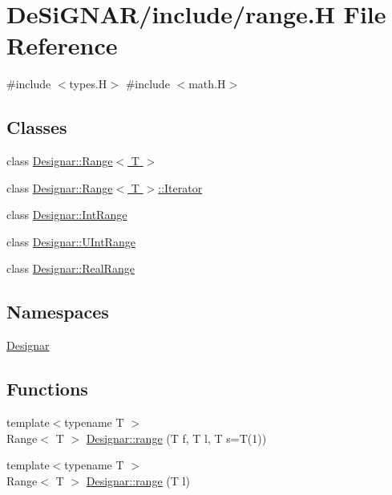 \hypertarget{range_8_h}{}\section{De\+Si\+G\+N\+A\+R/include/range.H File Reference}
\label{range_8_h}
{\ttfamily \#include $<$types.\+H$>$}\newline
{\ttfamily \#include $<$math.\+H$>$}\newline
\subsection*{Classes}
\begin{DoxyCompactItemize}
\item 
class \hyperlink{class_designar_1_1_range}{Designar\+::\+Range$<$ T $>$}
\item 
class \hyperlink{class_designar_1_1_range_1_1_iterator}{Designar\+::\+Range$<$ T $>$\+::\+Iterator}
\item 
class \hyperlink{class_designar_1_1_int_range}{Designar\+::\+Int\+Range}
\item 
class \hyperlink{class_designar_1_1_u_int_range}{Designar\+::\+U\+Int\+Range}
\item 
class \hyperlink{class_designar_1_1_real_range}{Designar\+::\+Real\+Range}
\end{DoxyCompactItemize}
\subsection*{Namespaces}
\begin{DoxyCompactItemize}
\item 
 \hyperlink{namespace_designar}{Designar}
\end{DoxyCompactItemize}
\subsection*{Functions}
\begin{DoxyCompactItemize}
\item 
{\footnotesize template$<$typename T $>$ }\\Range$<$ T $>$ \hyperlink{namespace_designar_aae435a76c71e126af37716ef5549d79d}{Designar\+::range} (T f, T l, T s=T(1))
\item 
{\footnotesize template$<$typename T $>$ }\\Range$<$ T $>$ \hyperlink{namespace_designar_a98dd2d05fccceaa32cdbf3f34c7dc120}{Designar\+::range} (T l)
\end{DoxyCompactItemize}
